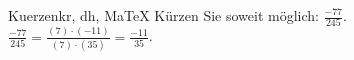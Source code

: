 \begin{MAufgabe}{Kuerzen}{kr, dh, MaTeX}
K\"urzen Sie soweit m\"oglich: $\frac{-77}{245}$.\\ 
\ifLsg\MLoesung
\quad $\frac{-77}{245}=\frac{(7)\cdot(-11)}{(7)\cdot(35)}=\frac{-11}{35}$.\else\relax\fi
 \end{MAufgabe}